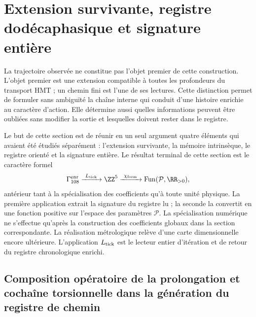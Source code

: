 \chapter{Extension survivante, registre dodécaphasique et signature entière}
\label{chap:extension-ruta-caracter}

La trajectoire observée ne constitue pas l'objet premier de cette
construction. L'objet premier est une extension compatible à toutes les
profondeurs du transport HMT ; un chemin fini est l'une de ses lectures. Cette
distinction permet de formuler sans ambiguïté la chaîne interne qui conduit d'une
histoire enrichie au caractère d'action. Elle détermine aussi quelles
informations peuvent être oubliées sans modifier la sortie et lesquelles doivent rester dans le
registre.

Le but de cette section est de réunir en un seul argument quatre éléments qui
avaient été étudiés séparément : l'extension survivante, la mémoire
intrinsèque, le registre orienté et la signature entière. Le résultat terminal de
cette section est le caractère formel
\[
 \Gamma_{108}^{\rm enr}
 \xrightarrow{\ L_{\rm tick}\ }
 \ZZ^5
 \xrightarrow{\ \chi_{\rm form}\ }
 \operatorname{Fun}(\mathcal P,\RR_{>0}),
\]
antérieur tant à la spécialisation des coefficients qu'à toute unité
physique. La première application extrait la signature du registre lu ; la seconde la
convertit en une fonction positive sur l'espace des paramètres
\(\mathcal P\). La spécialisation numérique ne s'effectue qu'après
la construction des coefficients globaux dans la section correspondante. La
réalisation métrologique relève d'une carte dimensionnelle encore ultérieure.
L'application \(L_{\rm tick}\) est le lecteur entier d'itération et de retour du
registre chronologique enrichi.

\section{Composition opératoire de la prolongation et cochaîne torsionnelle dans la génération du registre de chemin}

